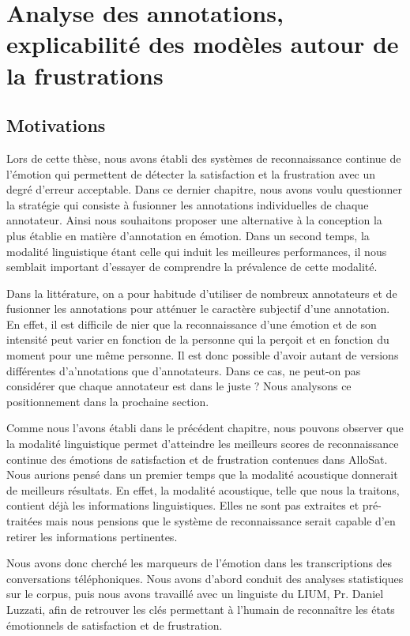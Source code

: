 \chapter{Analyse des annotations, explicabilité des modèles autour de la frustrations}
\label{chapitre7}

\section{Motivations}
Lors de cette thèse, nous avons établi des systèmes de reconnaissance continue de l'émotion qui permettent de détecter la satisfaction et la frustration avec un degré d'erreur acceptable.
Dans ce dernier chapitre, nous avons voulu questionner la stratégie qui consiste à fusionner les annotations individuelles de chaque annotateur.
Ainsi nous souhaitons proposer une alternative à la conception la plus établie en matière d'annotation en émotion.
Dans un second temps, la modalité linguistique étant celle qui induit les meilleures performances, il nous semblait important d'essayer de comprendre la prévalence de cette modalité.

Dans la littérature, on a pour habitude d'utiliser de nombreux annotateurs et de fusionner les annotations pour atténuer le caractère subjectif d'une annotation. En effet, il est difficile de nier que la reconnaissance d'une émotion et de son intensité peut varier en fonction de la personne qui la perçoit et en fonction du moment pour une même personne. Il est donc possible d'avoir autant de versions différentes d'a'nnotations que d'annotateurs. Dans ce cas, ne peut-on pas considérer que chaque annotateur est dans le juste ? Nous analysons ce positionnement dans la prochaine section.

Comme nous l'avons établi dans le précédent chapitre, nous pouvons observer que la modalité linguistique permet d'atteindre les meilleurs scores de reconnaissance continue des émotions de satisfaction et de frustration contenues dans AlloSat. Nous aurions pensé dans un premier temps que la modalité acoustique donnerait de meilleurs résultats. En effet, la modalité acoustique, telle que nous la traitons, contient déjà les informations linguistiques. Elles ne sont pas extraites et pré-traitées mais nous pensions que le système de reconnaissance serait capable d'en retirer les informations pertinentes.

Nous avons donc cherché les marqueurs de l'émotion dans les transcriptions des conversations téléphoniques. Nous avons d'abord conduit des analyses statistiques sur le corpus, puis nous avons travaillé avec un linguiste du LIUM, Pr. Daniel Luzzati, afin de retrouver les clés permettant à l'humain de reconnaître les états émotionnels de satisfaction et de frustration.

